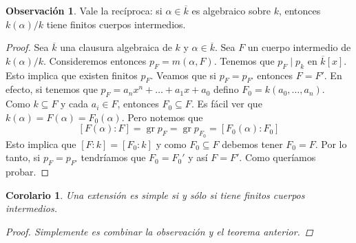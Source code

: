 \documentclass[12pt]{book}
\newtheorem{cor}[teo]{Corolario}
\theoremstyle{definition}
\newtheorem{obs}[teo]{Observación}
\DeclareMathOperator{\gr}{gr}
\begin{document}
\begin{obs}
Vale la recíproca: si $\alpha\in\overline{k}$ es algebraico sobre $k$, entonces $k(\alpha)/k$ tiene finitos cuerpos intermedios.
\begin{proof}
Sea $\overline{k}$ una clausura algebraica de $k$ y $\alpha\in\overline{k}$. Sea $F$ un cuerpo intermedio de $k(\alpha)/k$. Consideremos entonces $p_F = m(\alpha,F)$. Tenemos que $p_F\mid p_k$ en $\overline{k}[x]$. Esto implica que existen finitos $p_F$. Veamos que si $p_F = p_{F'}$ entonces $F=F'$. En efecto, si tenemos que $p_F = a_n x^n + \ldots + a_1x+a_0$ defino $F_0 = k(a_0,\ldots,a_n)$. Como $k\subseteq F$ y cada $a_i\in F$, entonces $F_0\subseteq F$. Es fácil ver que $k(\alpha) = F(\alpha)=F_0(\alpha)$. Pero notemos que $$[F(\alpha):F] = \gr p_F = \gr p_{F_0} = [F_0(\alpha):F_0]$$ Esto implica que $[F:k] = [F_0 : k]$ y como $F_0\subseteq F$ debemos tener $F_0=F$. Por lo tanto, si $p_F = p_{F'}$ tendríamos que $F_0 = F_0'$ y así $F = F'$. Como queríamos probar.
\end{proof}
\end{obs}

\begin{cor}
Una extensión es simple si y sólo si tiene finitos cuerpos intermedios.
\begin{proof}
Simplemente es combinar la observación y el teorema anterior.
\end{proof}
\end{cor}
\end{document}
